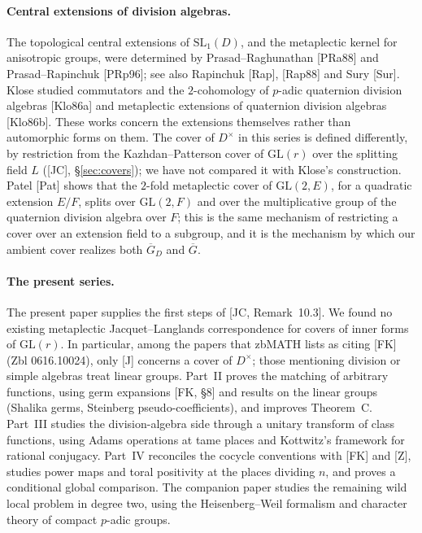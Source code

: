 \documentclass[12pt]{article}
\newcommand{\ov}[1]{\overline{#1}}
\newcommand{\GL}{\mathrm{GL}}
\newcommand{\SL}{\mathrm{SL}}
\newcommand{\Gb}{\ov{G}}
\newcommand{\GDb}{\ov{G}_D}
\theoremstyle{plain}
\theoremstyle{definition}
\begin{document}
\paragraph{Central extensions of division algebras.} The topological central extensions of $\SL_1(D)$, and the metaplectic kernel for anisotropic groups, were determined by Prasad--Raghunathan [PRa88] and Prasad--Rapinchuk [PRp96]; see also Rapinchuk [Rap], [Rap88] and Sury [Sur]. Klose studied commutators and the $2$-cohomology of $p$-adic quaternion division algebras [Klo86a] and metaplectic extensions of quaternion division algebras [Klo86b]. These works concern the extensions themselves rather than automorphic forms on them. The cover of $D^\times$ in this series is defined differently, by restriction from the Kazhdan--Patterson cover of $\GL(r)$ over the splitting field $L$ ([JC], \S\ref{sec:covers}); we have not compared it with Klose's construction. Patel [Pat] shows that the $2$-fold metaplectic cover of $\GL(2,E)$, for a quadratic extension $E/F$, splits over $\GL(2,F)$ and over the multiplicative group of the quaternion division algebra over $F$; this is the same mechanism of restricting a cover over an extension field to a subgroup, and it is the mechanism by which our ambient cover realizes both $\GDb$ and $\Gb$.

\paragraph{The present series.} The present paper supplies the first steps of [JC, Remark~10.3]. We found no existing metaplectic Jacquet--Langlands correspondence for covers of inner forms of $\GL(r)$. In particular, among the papers that zbMATH lists as citing [FK] (Zbl 0616.10024), only [J] concerns a cover of $D^\times$; those mentioning division or simple algebras treat linear groups. Part~II proves the matching of arbitrary functions, using germ expansions [FK, \S8] and results on the linear groups (Shalika germs, Steinberg pseudo-coefficients), and improves Theorem~C. Part~III studies the division-algebra side through a unitary transform of class functions, using Adams operations at tame places and Kottwitz's framework for rational conjugacy. Part~IV reconciles the cocycle conventions with [FK] and [Z], studies power maps and toral positivity at the places dividing $n$, and proves a conditional global comparison. The companion paper studies the remaining wild local problem in degree two, using the Heisenberg--Weil formalism and character theory of compact $p$-adic groups.
\end{document}
